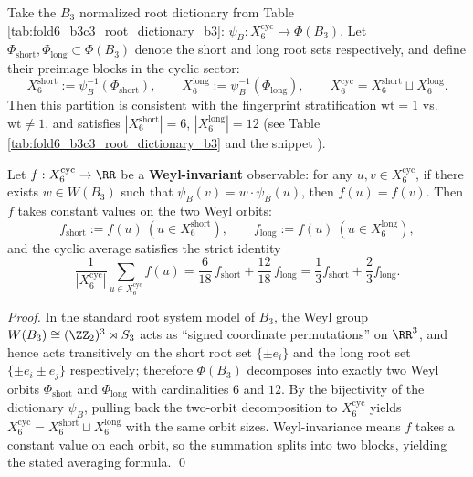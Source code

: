 \begin{corollary}\label{cor:fold6-weyl-two-orbit-compression}
Take the \(B_3\) normalized root dictionary from Table \ref{tab:fold6_b3c3_root_dictionary_b3}:
\(\psi_B:X_6^{\mathrm{cyc}}\to \Phi(B_3)\).
Let \(\Phi_{\mathrm{short}},\Phi_{\mathrm{long}}\subset\Phi(B_3)\) denote the short and long root sets respectively, and define their preimage blocks in the cyclic sector:
\[
X_6^{\mathrm{short}}:=\psi_B^{-1}(\Phi_{\mathrm{short}}),\qquad
X_6^{\mathrm{long}}:=\psi_B^{-1}(\Phi_{\mathrm{long}}),
\qquad
X_6^{\mathrm{cyc}}=X_6^{\mathrm{short}}\sqcup X_6^{\mathrm{long}}.
\]
Then this partition is consistent with the fingerprint stratification \(\mathrm{wt}=1\) vs.\ \(\mathrm{wt}\neq 1\), and satisfies
\(|X_6^{\mathrm{short}}|=6\), \(|X_6^{\mathrm{long}}|=12\) (see Table \ref{tab:fold6_b3c3_root_dictionary_b3} and the snippet \texttt{}).
\par
Let \(f:X_6^{\mathrm{cyc}}\to\RR\) be a \textbf{Weyl-invariant} observable: for any \(u,v\in X_6^{\mathrm{cyc}}\), if there exists \(w\in W(B_3)\) such that
\(\psi_B(v)=w\cdot \psi_B(u)\), then \(f(u)=f(v)\).
Then \(f\) takes constant values on the two Weyl orbits:
\[
f_{\mathrm{short}}:=f(u)\ (u\in X_6^{\mathrm{short}}),\qquad
f_{\mathrm{long}}:=f(u)\ (u\in X_6^{\mathrm{long}}),
\]
and the cyclic average satisfies the strict identity
\[
\frac{1}{|X_6^{\mathrm{cyc}}|}\sum_{u\in X_6^{\mathrm{cyc}}} f(u)
=
\frac{6}{18}\,f_{\mathrm{short}}+\frac{12}{18}\,f_{\mathrm{long}}
=
\frac13 f_{\mathrm{short}}+\frac23 f_{\mathrm{long}}.
\]
\end{corollary}

\begin{proof}
In the standard root system model of \(B_3\), the Weyl group \(W(B_3)\cong (\ZZ_2)^3\rtimes S_3\) acts as ``signed coordinate permutations'' on \(\RR^3\), and hence acts transitively on the short root set \(\{\pm e_i\}\) and the long root set \(\{\pm e_i\pm e_j\}\) respectively; therefore \(\Phi(B_3)\) decomposes into exactly two Weyl orbits \(\Phi_{\mathrm{short}}\) and \(\Phi_{\mathrm{long}}\) with cardinalities \(6\) and \(12\).
By the bijectivity of the dictionary \(\psi_B\), pulling back the two-orbit decomposition to \(X_6^{\mathrm{cyc}}\) yields \(X_6^{\mathrm{cyc}}=X_6^{\mathrm{short}}\sqcup X_6^{\mathrm{long}}\) with the same orbit sizes.
Weyl-invariance means \(f\) takes a constant value on each orbit, so the summation splits into two blocks, yielding the stated averaging formula. \qed
\end{proof}

